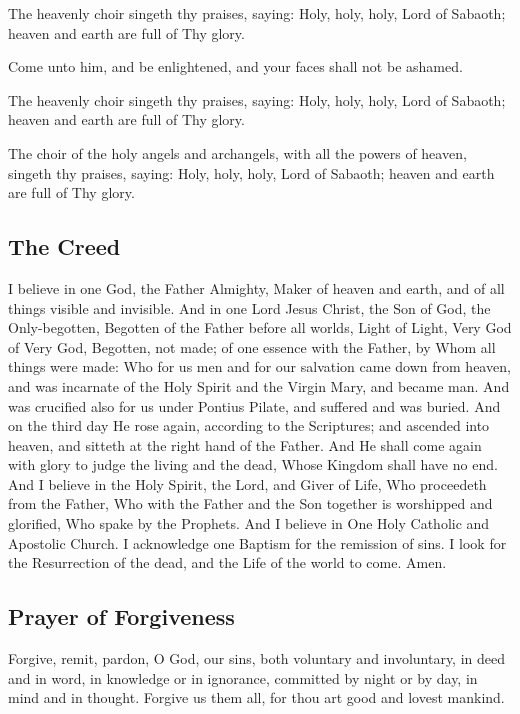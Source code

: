 \documentclass[twoside, letterpaper, 12pt]{report}
\begin{document}
				The heavenly choir singeth thy praises, saying: Holy, holy, holy, Lord of Sabaoth; heaven and earth are full of Thy glory.

				Come unto him, and be enlightened, and your faces shall not be ashamed.
				
				The heavenly choir singeth thy praises, saying: Holy, holy, holy, Lord of Sabaoth; heaven and earth are full of Thy glory.

				\glory

				The choir of the holy angels and archangels, with all the powers of heaven, singeth thy praises, saying: Holy, holy, holy, Lord of Sabaoth; heaven and earth are full of Thy glory.

				\nowandever

		\subsection*{The Creed}

			\people I believe in one God, the Father Almighty, Maker of heaven and earth, and of all things visible and invisible. And in one Lord Jesus Christ, the Son of God, the Only-begotten, Begotten of the Father before all worlds, Light of Light, Very God of Very God, Begotten, not made; of one essence with the Father, by Whom all things were made: Who for us men and for our salvation came down from heaven, and was incarnate of the Holy Spirit and the Virgin Mary, and became man. And was crucified also for us under Pontius Pilate, and suffered and was buried. And on the third day He rose again, according to the Scriptures; and ascended into heaven, and sitteth at the right hand of the Father. And He shall come again with glory to judge the living and the dead, Whose Kingdom shall have no end. And I believe in the Holy Spirit, the Lord, and Giver of Life, Who proceedeth from the Father, Who with the Father and the Son together is worshipped and glorified, Who spake by the Prophets. And I believe in One Holy Catholic and Apostolic Church. I acknowledge one Baptism for the remission of sins. I look for the Resurrection of the dead, and the Life of the world to come.  Amen.

		\subsection*{Prayer of Forgiveness}

			\reader Forgive, remit, pardon, O God, our sins, both voluntary and involuntary, in deed and in word, in knowledge or in ignorance, committed by night or by day, in mind and in thought.  Forgive us them all, for thou art good and lovest mankind.
			
\end{document}
